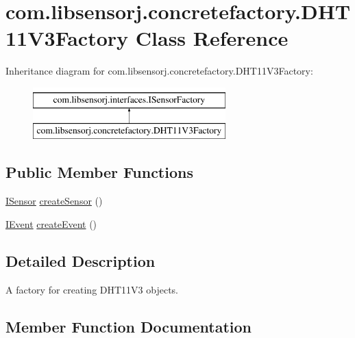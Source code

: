 \hypertarget{classcom_1_1libsensorj_1_1concretefactory_1_1DHT11V3Factory}{}\section{com.\+libsensorj.\+concretefactory.\+D\+H\+T11\+V3\+Factory Class Reference}
\label{classcom_1_1libsensorj_1_1concretefactory_1_1DHT11V3Factory}
Inheritance diagram for com.\+libsensorj.\+concretefactory.\+D\+H\+T11\+V3\+Factory\+:\begin{figure}[H]
\begin{center}
\leavevmode
\includegraphics[height=2.000000cm]{classcom_1_1libsensorj_1_1concretefactory_1_1DHT11V3Factory}
\end{center}
\end{figure}
\subsection*{Public Member Functions}
\begin{DoxyCompactItemize}
\item 
\hyperlink{interfacecom_1_1libsensorj_1_1interfaces_1_1ISensor}{I\+Sensor} \hyperlink{classcom_1_1libsensorj_1_1concretefactory_1_1DHT11V3Factory_ad89c967025d654490729d2f69438805e}{create\+Sensor} ()
\item 
\hyperlink{classcom_1_1libsensorj_1_1interfaces_1_1IEvent}{I\+Event} \hyperlink{classcom_1_1libsensorj_1_1concretefactory_1_1DHT11V3Factory_a7621f6dc5c877e6dfb160f68e50fd319}{create\+Event} ()
\end{DoxyCompactItemize}


\subsection{Detailed Description}
A factory for creating D\+H\+T11\+V3 objects. 

\subsection{Member Function Documentation}
\hypertarget{classcom_1_1libsensorj_1_1concretefactory_1_1DHT11V3Factory_a7621f6dc5c877e6dfb160f68e50fd319}{}
